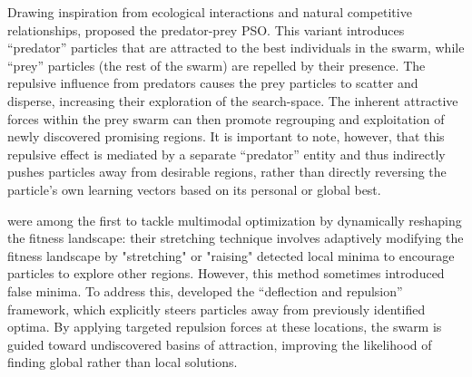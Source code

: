 {Drawing inspiration from ecological interactions and natural competitive relationships, \citet{silva2002empirical} proposed the predator-prey PSO. This variant introduces ``predator'' particles that are attracted to the best individuals in the swarm, while ``prey'' particles (the rest of the swarm) are repelled by their presence. The repulsive influence from predators causes the prey particles to scatter and disperse, increasing their exploration of the \gls{search-space}. The inherent attractive forces within the prey swarm can then promote regrouping and exploitation of newly discovered promising regions.
It is important to note, however, that this repulsive effect is mediated by a separate ``predator'' entity and thus indirectly pushes particles away from desirable regions, rather than directly reversing the particle's own learning vectors based on its personal or global best.


\citet{parsopoulos2001stretching} were among the first to tackle multimodal optimization by dynamically reshaping the fitness landscape: their stretching technique involves adaptively modifying the fitness landscape by "stretching" or "raising" detected local minima to encourage particles to explore other regions. However, this method sometimes introduced false minima. To address this, \citet{parsopoulos2004global} developed the ``deflection and repulsion'' framework, which explicitly steers particles away from previously identified optima. By applying targeted repulsion forces at these locations, the swarm is guided toward undiscovered basins of attraction, improving the likelihood of finding global rather than local solutions.


}
